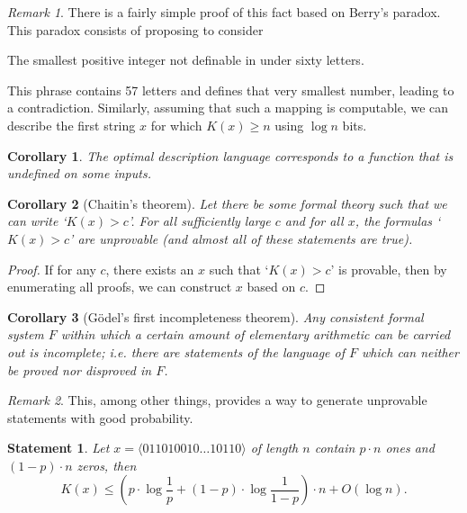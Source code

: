 \documentclass[12pt,sans]{article}
\theoremstyle{definition}
\theoremstyle{plain}
\newtheorem{statement}{Statement}[section]
\newtheorem{corollary}{Corollary}[section]
\theoremstyle{remark}
\newtheorem{remark}{Remark}[section]
\begin{document}
\begin{remark}
    There is a fairly simple proof of this fact based on Berry's paradox. This paradox consists of proposing to consider
    \begin{center}
        The smallest positive integer not definable in under sixty letters.
    \end{center}
    This phrase contains 57 letters and defines that very smallest number, leading to a contradiction. Similarly, assuming that such a mapping is computable, we can describe the first string $x$ for which $K(x) \ge n$ using $\log n$ bits.
\end{remark}

\begin{corollary}
    The optimal description language corresponds to a function that is undefined on some inputs.
\end{corollary}

\begin{corollary}[Chaitin's theorem]
    Let there be some formal theory such that we can write `$K(x) > c$'. For all sufficiently large $c$ and for all $x$, the formulas `$K(x) > c$' are unprovable (and almost all of these statements are true).
\end{corollary}

\begin{proof}
    If for any $c$, there exists an $x$ such that `$K(x) > c$' is provable, then by enumerating all proofs, we can construct $x$ based on $c$.
\end{proof}

\begin{corollary}[Gödel's first incompleteness theorem]
    Any consistent formal system $F$ within which a certain amount of elementary arithmetic can be carried out is incomplete; i.e. there are statements of the language of $F$ which can neither be proved nor disproved in $F$.
\end{corollary}

\begin{remark}
    This, among other things, provides a way to generate unprovable statements with good probability.
\end{remark}

\begin{statement}\label{st:kologorov:entropy}
    Let $x = \langle{011010010\dotso 10110}\rangle$ of length $n$ contain $p \cdot n$ ones and $(1-p) \cdot n$ zeros, then
    \[
    K(x) \le \left(p \cdot \log \frac{1}{p} + (1-p) \cdot \log \frac{1}{1-p}\right) \cdot n + O(\log n).
    \]
\end{statement}
\end{document}
